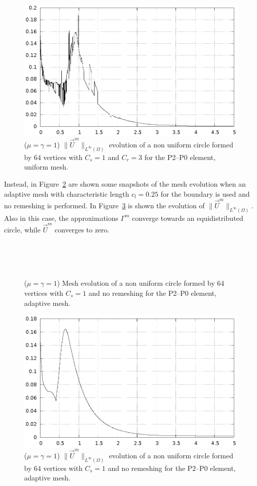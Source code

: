 \documentclass[a4paper,12pt,onecolumn]{article}
\begin{document}
\begin{figure}[htbp]
  \centering
  \includegraphics[width=.45\textwidth]{figures/nonuniform_bubble_velocity_remesh.ps}
  \caption{($\mu=\gamma=1$) $\|\vec U^m\|_{L^\infty(\Omega)}$ evolution of a non uniform circle formed by 64 vertices with $C_s=1$ and $C_r=3$ for the P2--P0 element, uniform mesh.}
  \label{fig:nonuniform_bubble_velocity_remesh}
\end{figure}

Instead, in Figure~\ref{fig:nonuniform_bubble_smooth} are shown some snapshots of the mesh evolution when an adaptive mesh with characteristic length $c_l=0.25$ for the boundary is used and no remeshing is performed. In Figure~\ref{fig:nonuniform_bubble_velocity_smooth} is shown the evolution of $\|\vec U^m\|_{L^\infty(\Omega)}$. Also in this case, the approximations $\Gamma^m$ converge towards an equidistributed circle, while $\vec U^m$ converges to zero.
\begin{figure}[htbp]
  \centering
  \\
  \quad
  \\
  \quad
  \\
  \caption{($\mu=\gamma=1$) Mesh evolution of a non uniform circle formed by 64 vertices with $C_s=1$ and no remeshing for the P2--P0 element, adaptive mesh.}
  \label{fig:nonuniform_bubble_smooth}
\end{figure}

\begin{figure}[htbp]
  \centering
  \includegraphics[width=.45\textwidth]{figures/nonuniform_bubble_velocity_smooth.ps}
  \caption{($\mu=\gamma=1$) $\|\vec U^m\|_{L^\infty(\Omega)}$ evolution of a non uniform circle formed by 64 vertices with $C_s=1$ and no remeshing for the P2--P0 element, adaptive mesh.}
  \label{fig:nonuniform_bubble_velocity_smooth}
\end{figure}
\end{document}
